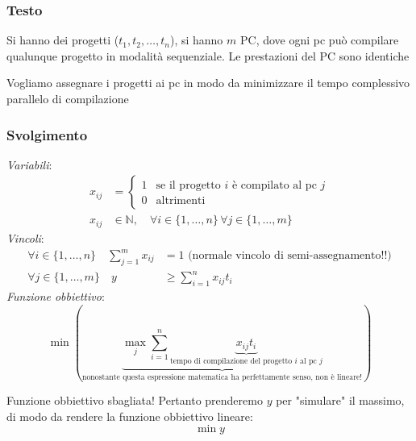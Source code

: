 \subsubsection{Testo}
Si hanno dei progetti ($t_1, t_2, \dots, t_n$), si hanno $m$ PC, dove ogni pc può compilare qualunque progetto in modalità sequenziale. Le prestazioni del PC sono identiche 

Vogliamo assegnare i progetti ai pc in modo da minimizzare il tempo complessivo parallelo di compilazione
\subsubsection{Svolgimento}
\textit{Variabili}:
\[
    \begin{align*}
        x_{ij} &= \begin{cases}
            1 & \text{se il progetto $i$ è compilato al pc $j$} \\
            0 & \text{altrimenti}
        \end{cases}\\
        x_{ij}&\in \mathbb{N}, \quad \forall i\in \{1,\dots, n\}\,\forall j\in \{1,\dots, m\} \
    \end{align*}
\]
\textit{Vincoli}:
\[
    \begin{align*}
        \forall i\in\{1,\dots,n\}\quad \sum_{j=1}^{m}x_{ij} &= 1 \text{ (normale vincolo di semi-assegnamento!!)}\\
        \forall j\in\{1,\dots,m\}\quad y&\geq \sum^n_{i=1}x_{ij}t_i 
    \end{align*}
\]
\textit{Funzione obbiettivo}:
\[
    \min (\underbrace{{\max_j \sum^n_{i=1}\underbrace{x_{ij}t_i}_{\text{tempo di compilazione del progetto $i$ al pc $j$}}}}_{\text{nonostante questa espressione matematica ha perfettamente senso, non è lineare!}})
\]

Funzione obbiettivo sbagliata! Pertanto prenderemo $y$ per "simulare" il massimo, di modo da rendere la funzione obbiettivo lineare:
\[
    \min y
\]